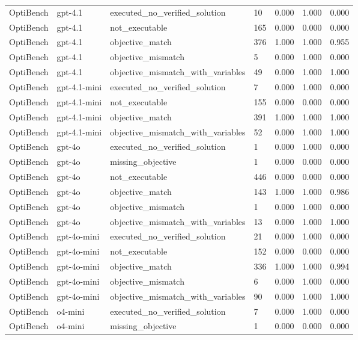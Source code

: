 \begin{table}[t]
\begin{tabular}{lllllll}
OptiBench & gpt-4.1 & executed\_no\_verified\_solution & 10 & 0.000 & 1.000 & 0.000 \\
OptiBench & gpt-4.1 & not\_executable & 165 & 0.000 & 0.000 & 0.000 \\
OptiBench & gpt-4.1 & objective\_match & 376 & 1.000 & 1.000 & 0.955 \\
OptiBench & gpt-4.1 & objective\_mismatch & 5 & 0.000 & 1.000 & 0.000 \\
OptiBench & gpt-4.1 & objective\_mismatch\_with\_variables & 49 & 0.000 & 1.000 & 1.000 \\
OptiBench & gpt-4.1-mini & executed\_no\_verified\_solution & 7 & 0.000 & 1.000 & 0.000 \\
OptiBench & gpt-4.1-mini & not\_executable & 155 & 0.000 & 0.000 & 0.000 \\
OptiBench & gpt-4.1-mini & objective\_match & 391 & 1.000 & 1.000 & 1.000 \\
OptiBench & gpt-4.1-mini & objective\_mismatch\_with\_variables & 52 & 0.000 & 1.000 & 1.000 \\
OptiBench & gpt-4o & executed\_no\_verified\_solution & 1 & 0.000 & 1.000 & 0.000 \\
OptiBench & gpt-4o & missing\_objective & 1 & 0.000 & 0.000 & 0.000 \\
OptiBench & gpt-4o & not\_executable & 446 & 0.000 & 0.000 & 0.000 \\
OptiBench & gpt-4o & objective\_match & 143 & 1.000 & 1.000 & 0.986 \\
OptiBench & gpt-4o & objective\_mismatch & 1 & 0.000 & 1.000 & 0.000 \\
OptiBench & gpt-4o & objective\_mismatch\_with\_variables & 13 & 0.000 & 1.000 & 1.000 \\
OptiBench & gpt-4o-mini & executed\_no\_verified\_solution & 21 & 0.000 & 1.000 & 0.000 \\
OptiBench & gpt-4o-mini & not\_executable & 152 & 0.000 & 0.000 & 0.000 \\
OptiBench & gpt-4o-mini & objective\_match & 336 & 1.000 & 1.000 & 0.994 \\
OptiBench & gpt-4o-mini & objective\_mismatch & 6 & 0.000 & 1.000 & 0.000 \\
OptiBench & gpt-4o-mini & objective\_mismatch\_with\_variables & 90 & 0.000 & 1.000 & 1.000 \\
OptiBench & o4-mini & executed\_no\_verified\_solution & 7 & 0.000 & 1.000 & 0.000 \\
OptiBench & o4-mini & missing\_objective & 1 & 0.000 & 0.000 & 0.000 \\

\end{tabular}
\end{table}
